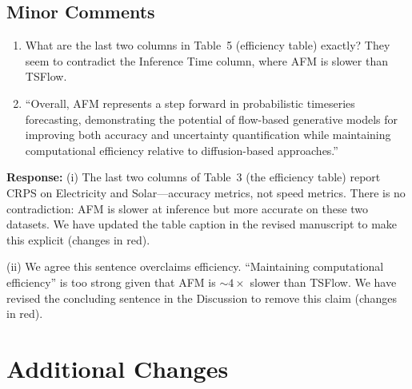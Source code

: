 \documentclass[11pt]{article}
\newcommand{\reviewertext}[1]{%
  \begin{reviewerquote}
    {\color{reviewercolor}\itshape #1}
  \end{reviewerquote}%
}
\newcommand{\authorresponse}[1]{%
  \textbf{Response:} #1\par\medskip
}
\begin{document}
\subsection{Minor Comments}

\reviewertext{%
\begin{enumerate}[nosep]
  \item What are the last two columns in Table~5 (efficiency table) exactly? They seem to contradict the Inference Time column, where AFM is slower than TSFlow.
  \item ``Overall, AFM represents a step forward in probabilistic timeseries forecasting, demonstrating the potential of flow-based generative models for improving both accuracy and uncertainty quantification while maintaining computational efficiency relative to diffusion-based approaches.''
\end{enumerate}
}

\authorresponse{%
(i) The last two columns of Table~3 (the efficiency table) report CRPS on Electricity and Solar---accuracy metrics, not speed metrics. There is no contradiction: AFM is slower at inference but more accurate on these two datasets. We have updated the table caption in the revised manuscript to make this explicit (changes in red).

(ii) We agree this sentence overclaims efficiency. ``Maintaining computational efficiency'' is too strong given that AFM is ${\sim}4\times$ slower than TSFlow. We have revised the concluding sentence in the Discussion to remove this claim (changes in red).
}

\section{Additional Changes}
\end{document}
